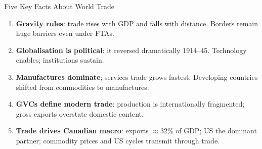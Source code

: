 \documentclass[aspectratio=169]{beamer}
\begin{document}
\begin{frame}{Five Key Facts About World Trade}

\begin{enumerate}\small
  \item \textbf{Gravity rules}: trade rises with GDP and falls with distance. Borders remain huge barriers even under FTAs.
  \item \textbf{Globalisation is political}: it reversed dramatically 1914--45. Technology enables; institutions sustain.
  \item \textbf{Manufactures dominate}; services trade grows fastest. Developing countries shifted from commodities to manufactures.
  \item \textbf{GVCs define modern trade}: production is internationally fragmented; gross exports overstate domestic content.
  \item \textbf{Trade drives Canadian macro}: exports $\approx$32\% of GDP; US the dominant partner; commodity prices and US cycles transmit through trade.
\end{enumerate}

\end{frame}
\end{document}
